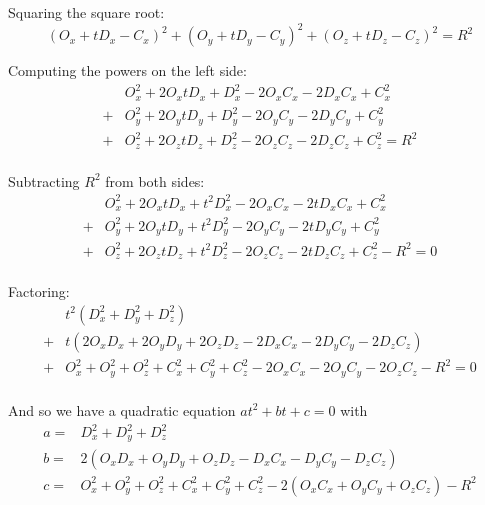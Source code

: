 \documentclass[a4paper,11pt]{article}
\begin{document}
\noindent
Squaring the square root:
\begin{equation}
(O_x + t D_x - C_x)^2 + (O_y + t D_y - C_y)^2 + (O_z + t D_z - C_z)^2 = R^2
\end{equation}

\noindent
Computing the powers on the left side:
\begin{equation}
\begin{align}
  & O_x^2 + 2 O_x t D_x + D_x^2 - 2 O_x C_x - 2 D_x C_x + C_x^2\\
+ & O_y^2 + 2 O_y t D_y + D_y^2 - 2 O_y C_y - 2 D_y C_y + C_y^2\\
+ & O_z^2 + 2 O_z t D_z + D_z^2 - 2 O_z C_z - 2 D_z C_z + C_z^2 = R^2\\
\end{align}
\end{equation}

\noindent
Subtracting $R^2$ from both sides:
\begin{equation}
\begin{align}
  & O_x^2 + 2 O_x t D_x + t^2 D_x^2 - 2 O_x C_x - 2 t D_x C_x + C_x^2\\
+ & O_y^2 + 2 O_y t D_y + t^2 D_y^2 - 2 O_y C_y - 2 t D_y C_y + C_y^2\\
+ & O_z^2 + 2 O_z t D_z + t^2 D_z^2 - 2 O_z C_z - 2 t D_z C_z + C_z^2 - R^2 = 0\\
\end{align}
\end{equation}

\noindent
Factoring:
\begin{equation}
\begin{align}
  & t^2(D_x^2 + D_y^2 + D_z^2)\\
+ & t(2 O_x D_x + 2 O_y D_y + 2 O_z D_z - 2 D_x C_x - 2 D_y C_y - 2 D_z C_z)\\
+ & O_x^2 + O_y^2 + O_z^2 + C_x^2 + C_y^2 + C_z^2 - 2 O_x C_x - 2 O_y C_y - 2 O_z C_z - R^2 = 0\\
\end{align}
\end{equation}

\noindent
And so we have a quadratic equation $at^2 + bt + c = 0$ with
\begin{align}
a = & D_x^2 + D_y^2 + D_z^2\\
b = & 2(O_x D_x + O_y D_y + O_z D_z - D_x C_x - D_y C_y - D_z C_z)\\
c = & O_x^2 + O_y^2 + O_z^2 + C_x^2 + C_y^2 + C_z^2 - 2(O_x C_x + O_y C_y + O_z C_z) - R^2
\end{align}
\end{document}
